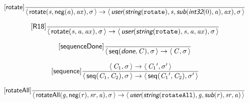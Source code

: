 \documentclass[10pt,leqno]{article}
\newcommand{\artVariable}[1]{\mbox{\em #1\/}}
\newcommand{\artConstructor}[1]{\mbox{\sf #1}}
\newcommand{\artCaseInsensitiveLiteral}[1]{\mbox{\tt #1}}
\newcommand{\artSpecial}[1]{\mbox{\sf\em #1}}
\begin{document}
\begin{equation}
\tag*{[\artConstructor{\sf rotate}]}\frac{}{\langle\, \artConstructor{\sf rotate}(\artVariable{s}, \artConstructor{\sf neg}(\artVariable{a}), \artVariable{ax}), \artVariable{$\sigma$}\,\rangle \rightarrow \langle\, \artSpecial{user}(\artSpecial{string}(\artCaseInsensitiveLiteral{rotate}), \artVariable{s}, \artSpecial{sub}(\artSpecial{int32}(0), \artVariable{a}), \artVariable{ax}), \artVariable{$\sigma$}\,\rangle }
\end{equation}

\begin{equation}
\tag*{[\artConstructor{\sf R18}]}\frac{}{\langle\, \artConstructor{\sf rotate}(\artVariable{s}, \artVariable{a}, \artVariable{ax}), \artVariable{$\sigma$}\,\rangle \rightarrow \langle\, \artSpecial{user}(\artSpecial{string}(\artCaseInsensitiveLiteral{rotate}), \artVariable{s}, \artVariable{a}, \artVariable{ax}), \artVariable{$\sigma$}\,\rangle }
\end{equation}

\begin{equation}
\tag*{[\artConstructor{\sf sequenceDone}]}\frac{}{\langle\, \artConstructor{\sf seq}(\artSpecial{done}, \artVariable{C}), \artVariable{$\sigma$}\,\rangle \rightarrow \langle\, \artVariable{C}, \artVariable{$\sigma$}\,\rangle }
\end{equation}

\begin{equation}
\tag*{[\artConstructor{\sf sequence}]}\frac{\langle\, \artVariable{C$_{1}$}, \artVariable{$\sigma$}\,\rangle \rightarrow \langle\, \artVariable{C$_{1}$\/$^\prime$}, \artVariable{$\sigma$\/$^\prime$}\,\rangle }{\langle\, \artConstructor{\sf seq}(\artVariable{C$_{1}$}, \artVariable{C$_{2}$}), \artVariable{$\sigma$}\,\rangle \rightarrow \langle\, \artConstructor{\sf seq}(\artVariable{C$_{1}$\/$^\prime$}, \artVariable{C$_{2}$}), \artVariable{$\sigma$\/$^\prime$}\,\rangle }
\end{equation}

\begin{equation}
\tag*{[\artConstructor{\sf rotateAll}]}\frac{}{\langle\, \artConstructor{\sf rotateAll}(\artVariable{g}, \artConstructor{\sf neg}(\artVariable{r}), \artVariable{sr}, \artVariable{a}), \artVariable{$\sigma$}\,\rangle \rightarrow \langle\, \artSpecial{user}(\artSpecial{string}(\artCaseInsensitiveLiteral{rotateAll}), \artVariable{g}, \artSpecial{sub}(\artVariable{r}), \artVariable{sr}, \artVariable{a})\,\rangle }
\end{equation}
\end{document}
